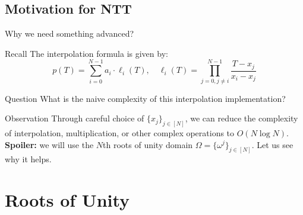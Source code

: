 \documentclass{zkdl-presentation-template}
\begin{document}
    \subsection{Motivation for NTT}
    \begin{frame}{Why we need something advanced?}
        \begin{remarkblock}{Recall}
            The interpolation formula is given by:
            \begin{equation*}
                p(T) = \sum_{i=0}^{N-1} a_i \cdot \ell_i(T), \quad \ell_i(T) = \prod_{j=0, j \neq i}^{N-1} \frac{T - x_j}{x_i - x_j}
            \end{equation*}
        \end{remarkblock}
        \pause

        \begin{questionblock}{Question}
            What is the naive complexity of this interpolation implementation?
        \end{questionblock}
        \pause

        \begin{block}{Observation}
            Through careful choice of $\{x_j\}_{j \in [N]}$, we can reduce the
            complexity of interpolation, multiplication, or other complex
            operations to $O(N \log N)$.\pause{} \textbf{Spoiler:} we will use
            the $N$th roots of unity domain $\Omega = \{\omega^j\}_{j \in [N]}$.
            Let us see why it helps.
        \end{block}
    \end{frame}

    \section{Roots of Unity}
\end{document}
